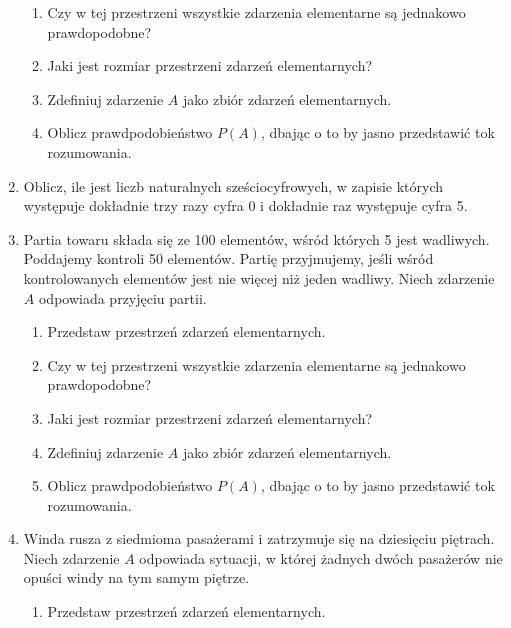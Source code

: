 \documentclass{mwart}
\newcommand{\ans}[1]{}
\newcommand{\ans}[1]{\emph{Odpowiedź:} #1}
\begin{document}
\begin{enumerate}
\begin{enumerate}
\item Czy w tej przestrzeni wszystkie zdarzenia elementarne są jednakowo prawdopodobne? \ans{Tak}%
\item Jaki jest rozmiar przestrzeni zdarzeń elementarnych? \ans{$\left|\Omega\right|=6^5$}%
\item Zdefiniuj zdarzenie $A$ jako zbiór zdarzeń elementarnych. \ans{$A=\{\omega_{i_1,\ldots,i_5}|\exists j: i_j=1 \land \forall k\neq j: i_k\neq 1\}$, $\left|A\right|=5\cdot5^4$}%
\item Oblicz prawdpodobieństwo $P(A)$, dbając o to by jasno przedstawić tok rozumowania. \ans{$P(A)=\frac{5^5}{6^5}=\frac{5}{6}^5\approx 0{,}40$}%
\end{enumerate}%
\item Oblicz, ile jest liczb naturalnych sześciocyfrowych, w zapisie których występuje dokładnie trzy razy cyfra 0 i dokładnie raz występuje cyfra 5. \ans{${8\choose 2}3\frac{5!}{3!}+8\cdot\left(\frac{5!}{3!2!}+\frac{5!}{3!}\right)=1920$}
\item Partia towaru składa się ze 100 elementów, wśród których 5 jest wadliwych. Poddajemy kontroli 50 elementów. Partię przyjmujemy, jeśli wśród kontrolowanych elementów jest nie więcej niż jeden wadliwy. Niech zdarzenie $A$ odpowiada przyjęciu partii.
\begin{enumerate}%
\item Przedstaw przestrzeń zdarzeń elementarnych. \ans{$\Omega=\{\omega_J|\left|J\right|=50 \land J\subset\{1,2,\ldots,100\}\}$}%
\item Czy w tej przestrzeni wszystkie zdarzenia elementarne są jednakowo prawdopodobne? \ans{Tak}%
\item Jaki jest rozmiar przestrzeni zdarzeń elementarnych? \ans{$\left|\Omega\right|={100\choose 50}$}%
\item Zdefiniuj zdarzenie $A$ jako zbiór zdarzeń elementarnych. \ans{$A=\{\omega_J|\left|J\cap \{1,2,\ldots,5\}\right|\leq 1\}$}%
\item Oblicz prawdpodobieństwo $P(A)$, dbając o to by jasno przedstawić tok rozumowania. \ans{$\left|A\right|={5\choose 1}{95\choose 49}+{95\choose 50}, P(A)\approx0{,}181$}%
\end{enumerate}%
\item Winda rusza z siedmioma pasażerami i zatrzymuje się na dziesięciu piętrach. Niech zdarzenie $A$ odpowiada sytuacji, w której żadnych dwóch pasażerów nie opuści windy na tym samym piętrze.
\begin{enumerate}%
\item Przedstaw przestrzeń zdarzeń elementarnych. \ans{$\Omega=\{\omega_{i_1,\ldots,i_7}|i_j=1,2,\ldots,10\}$}%

\end{enumerate}
\end{enumerate}
\end{document}
